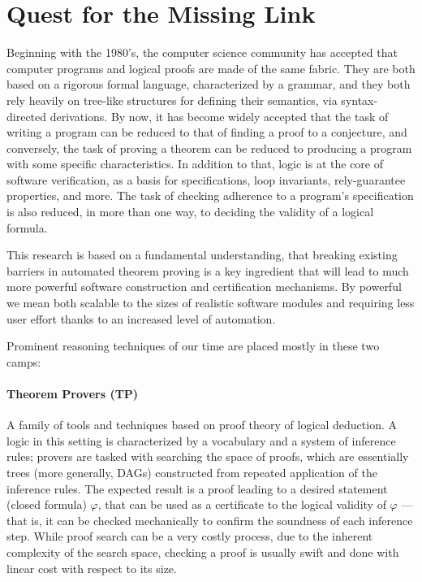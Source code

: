 
\section{Quest for the Missing Link}

Beginning with the 1980's, the computer science community has accepted
that computer programs and logical proofs are made of the same fabric.
They are both based on a rigorous formal language, characterized by a grammar,
and they both rely heavily on tree-like structures for defining their semantics,
via syntax-directed derivations.
By now, it has become widely accepted that the task of writing a program can be
reduced to that of finding a proof to a conjecture, and conversely, the task of
proving a theorem can be reduced to producing a program with some specific
characteristics.
In addition to that, logic is at the core of software verification, as a basis
for specifications, loop invariants, rely-guarantee properties, and more.
The task of checking adherence to a program's specification is also reduced, in
more than one way, to deciding the validity of a logical formula.

This research is based on a fundamental understanding, that breaking existing
barriers in automated theorem proving is a key ingredient that will lead to
much more powerful software construction and certification mechanisms.
By powerful we mean both scalable to the sizes of realistic software modules
and requiring less user effort thanks to an increased level of automation.

Prominent reasoning techniques of our time are placed mostly in these two camps:

\paragraph{Theorem Provers (TP)} A family of tools and techniques based on proof
theory of logical deduction.
A logic in this setting is characterized by a vocabulary and a system of
inference rules; provers are tasked with searching the space of proofs, which
are essentially trees (more generally, DAGs) constructed from repeated
application of the inference rules.
The expected result is a proof leading to a desired statement (closed formula)
$\varphi$, that can be used as a certificate to the logical validity of
$\varphi$ --- that is, it can be checked mechanically to confirm the soundness
of each inference step.
While proof search can be a very costly process, due to the inherent complexity
of the search space, checking a proof is usually swift and done with linear
cost with respect to its size.


